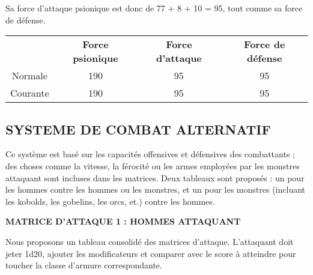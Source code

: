 \bigskip

Sa force d'attaque psionique est donc de 77 + 8 + 10 = 95, tout comme sa force de défense.

\bigskip

\begin{tabular}{cccc}
& \textbf{Force psionique} & \textbf{Force d'attaque} & \textbf{Force de défense}  \\
Normale     & 190 & 95 & 95 \\
Courante    & 190 & 95 & 95 \\
\end{tabular}

\newpage
\subsection*{SYSTEME DE COMBAT ALTERNATIF}
\label{custom-combat-alternatif}

Ce système est basé sur les capacités offensives et défensives des combattants ; des choses comme la vitesse, la férocité ou les armes employées par les monstres attaquant sont incluses dans les matrices. Deux tableaux sont proposés : un pour les hommes contre les hommes ou les monstres, et un pour les monstres (incluant les kobolds, les gobelins, les orcs, et.) contre les hommes.

\bigskip

\textbf{MATRICE D'ATTAQUE 1 : HOMMES ATTAQUANT}

\bigskip

Nous proposons un tableau consolidé des matrices d'attaque. L'attaquant doit jeter 1d20, ajouter les modificateurs et comparer avec le score à atteindre pour toucher la classe d'armure correspondante.

\bigskip


